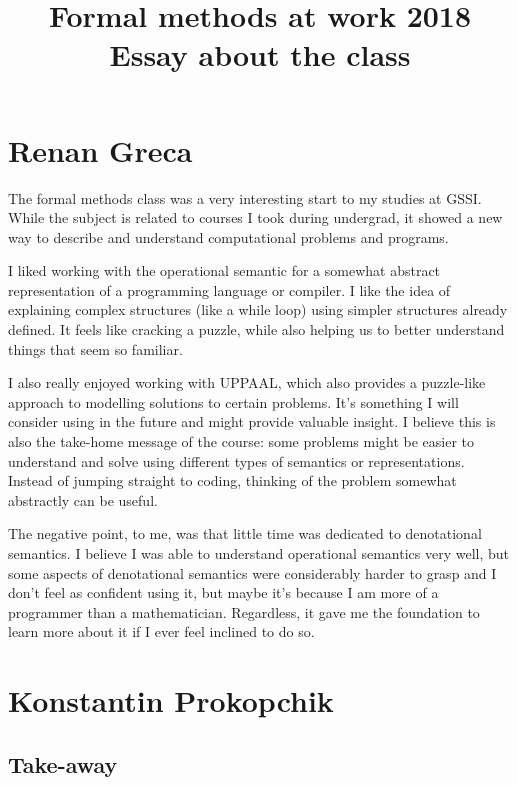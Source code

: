 \documentclass[11pt]{article}
\begin{document}
\title{Formal methods at work 2018\\Essay about the class}


\section*{Renan Greca}

The formal methods class was a very interesting start to my studies at GSSI. While the subject is related to courses I took during undergrad, it showed a new way to describe and understand computational problems and programs.

I liked working with the operational semantic for a somewhat abstract representation of a programming language or compiler. I like the idea of explaining complex structures (like a while loop) using simpler structures already defined. It feels like cracking a puzzle, while also helping us to better understand things that seem so familiar.

I also really enjoyed working with UPPAAL, which also provides a puzzle-like approach to modelling solutions to certain problems. It's something I will consider using in the future and might provide valuable insight. I believe this is also the take-home message of the course: some problems might be easier to understand and solve using different types of semantics or representations. Instead of jumping straight to coding, thinking of the problem somewhat abstractly can be useful.

The negative point, to me, was that little time was dedicated to denotational semantics. I believe I was able to understand operational semantics very well, but some aspects of denotational semantics were considerably harder to grasp and I don't feel as confident using it, but maybe it's because I am more of a programmer than a mathematician. Regardless, it gave me the foundation to learn more about it if I ever feel inclined to do so.

\section*{Konstantin Prokopchik}
\subsection*{Take-away}
\end{document}
